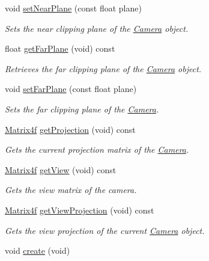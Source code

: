 \begin{DoxyCompactItemize}
void \hyperlink{classsparky_1_1_camera_a20045ff84f3e173da57e990e028216c6}{set\+Near\+Plane} (const float plane)
\begin{DoxyCompactList}\small\item\em Sets the near clipping plane of the \hyperlink{classsparky_1_1_camera}{Camera} object. \end{DoxyCompactList}\item 
float \hyperlink{classsparky_1_1_camera_a2b1c1e646249cd1740516c6188029d40}{get\+Far\+Plane} (void) const 
\begin{DoxyCompactList}\small\item\em Retrieves the far clipping plane of the \hyperlink{classsparky_1_1_camera}{Camera} object. \end{DoxyCompactList}\item 
void \hyperlink{classsparky_1_1_camera_aa2ab2530f68557f0515a70a58fcf0cbf}{set\+Far\+Plane} (const float plane)
\begin{DoxyCompactList}\small\item\em Sets the far clipping plane of the \hyperlink{classsparky_1_1_camera}{Camera}. \end{DoxyCompactList}\item 
\hyperlink{classsparky_1_1_matrix4}{Matrix4f} \hyperlink{classsparky_1_1_camera_ae07f444670016de9d19f4a85a1b11870}{get\+Projection} (void) const 
\begin{DoxyCompactList}\small\item\em Gets the current projection matrix of the \hyperlink{classsparky_1_1_camera}{Camera}. \end{DoxyCompactList}\item 
\hyperlink{classsparky_1_1_matrix4}{Matrix4f} \hyperlink{classsparky_1_1_camera_aea44f8ff5da28961979fc4dc413d4de2}{get\+View} (void) const 
\begin{DoxyCompactList}\small\item\em Gets the view matrix of the camera. \end{DoxyCompactList}\item 
\hyperlink{classsparky_1_1_matrix4}{Matrix4f} \hyperlink{classsparky_1_1_camera_a98323dbd836bf578e2a764a9147af4cd}{get\+View\+Projection} (void) const 
\begin{DoxyCompactList}\small\item\em Gets the view projection of the current \hyperlink{classsparky_1_1_camera}{Camera} object. \end{DoxyCompactList}\item 
void \hyperlink{classsparky_1_1_camera_a7cd7d121d034bde92c548055eb9a9263}{create} (void)\hypertarget{classsparky_1_1_camera_a7cd7d121d034bde92c548055eb9a9263}{}\label{classsparky_1_1_camera_a7cd7d121d034bde92c548055eb9a9263}


\end{DoxyCompactItemize}
